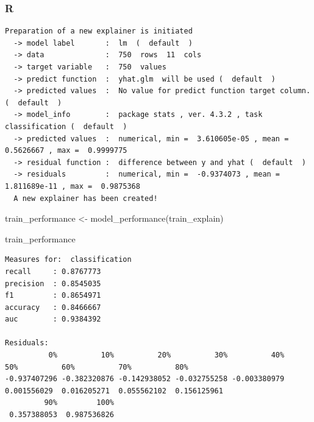 \documentclass[
  letterpaper,
]{krantz}
\newenvironment{Shaded}{}{}
\newcommand{\AttributeTok}[1]{\textcolor[rgb]{0.49,0.56,0.16}{#1}}
\newcommand{\FunctionTok}[1]{\textcolor[rgb]{0.02,0.16,0.49}{#1}}
\newcommand{\NormalTok}[1]{#1}
\newcommand{\OtherTok}[1]{\textcolor[rgb]{0.00,0.44,0.13}{#1}}
\newcommand{\SpecialCharTok}[1]{\textcolor[rgb]{0.25,0.44,0.63}{#1}}
\begin{document}
\subsubsection{R}

\begin{Shaded}
\end{Shaded}

\begin{verbatim}
Preparation of a new explainer is initiated
  -> model label       :  lm  (  default  )
  -> data              :  750  rows  11  cols 
  -> target variable   :  750  values 
  -> predict function  :  yhat.glm  will be used (  default  )
  -> predicted values  :  No value for predict function target column. (  default  )
  -> model_info        :  package stats , ver. 4.3.2 , task classification (  default  ) 
  -> predicted values  :  numerical, min =  3.610605e-05 , mean =  0.5626667 , max =  0.9999775  
  -> residual function :  difference between y and yhat (  default  )
  -> residuals         :  numerical, min =  -0.9374073 , mean =  1.811689e-11 , max =  0.9875368  
  A new explainer has been created!  
\end{verbatim}

\begin{Shaded}
\begin{Highlighting}[]
\NormalTok{train\_performance }\OtherTok{\textless{}{-}} \FunctionTok{model\_performance}\NormalTok{(train\_explain)}

\NormalTok{train\_performance}
\end{Highlighting}
\end{Shaded}

\begin{verbatim}
Measures for:  classification
recall     : 0.8767773 
precision  : 0.8545035 
f1         : 0.8654971 
accuracy   : 0.8466667 
auc        : 0.9384392

Residuals:
          0%          10%          20%          30%          40%          50%          60%          70%          80% 
-0.937407296 -0.382320876 -0.142938052 -0.032755258 -0.003380979  0.001556029  0.016205271  0.055562102  0.156125961 
         90%         100% 
 0.357388053  0.987536826 
\end{verbatim}
\end{document}
